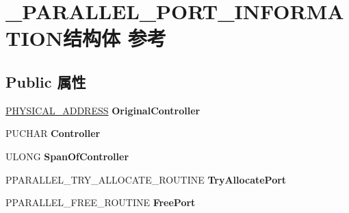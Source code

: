 \hypertarget{struct___p_a_r_a_l_l_e_l___p_o_r_t___i_n_f_o_r_m_a_t_i_o_n}{}\section{\+\_\+\+P\+A\+R\+A\+L\+L\+E\+L\+\_\+\+P\+O\+R\+T\+\_\+\+I\+N\+F\+O\+R\+M\+A\+T\+I\+O\+N结构体 参考}
\label{struct___p_a_r_a_l_l_e_l___p_o_r_t___i_n_f_o_r_m_a_t_i_o_n}
\subsection*{Public 属性}
\begin{DoxyCompactItemize}
\item 
\mbox{\label{struct___p_a_r_a_l_l_e_l___p_o_r_t___i_n_f_o_r_m_a_t_i_o_n_ad14cc1e5eae1beb81ab5bc08046a8927}} 
\hyperlink{union___l_a_r_g_e___i_n_t_e_g_e_r}{P\+H\+Y\+S\+I\+C\+A\+L\+\_\+\+A\+D\+D\+R\+E\+SS} {\bfseries Original\+Controller}
\item 
\mbox{\label{struct___p_a_r_a_l_l_e_l___p_o_r_t___i_n_f_o_r_m_a_t_i_o_n_a5a1355ab7256e672e46e64cd4e62c74e}} 
P\+U\+C\+H\+AR {\bfseries Controller}
\item 
\mbox{\label{struct___p_a_r_a_l_l_e_l___p_o_r_t___i_n_f_o_r_m_a_t_i_o_n_a6f216b012eaf7240f81d5950bbd25c30}} 
U\+L\+O\+NG {\bfseries Span\+Of\+Controller}
\item 
\mbox{\label{struct___p_a_r_a_l_l_e_l___p_o_r_t___i_n_f_o_r_m_a_t_i_o_n_a7a392790c25d6a32cf1999bcb4ad6974}} 
P\+P\+A\+R\+A\+L\+L\+E\+L\+\_\+\+T\+R\+Y\+\_\+\+A\+L\+L\+O\+C\+A\+T\+E\+\_\+\+R\+O\+U\+T\+I\+NE {\bfseries Try\+Allocate\+Port}
\item 
\mbox{\label{struct___p_a_r_a_l_l_e_l___p_o_r_t___i_n_f_o_r_m_a_t_i_o_n_a1d14d1be0c6387ad51d75a0c3ec23f1a}} 
P\+P\+A\+R\+A\+L\+L\+E\+L\+\_\+\+F\+R\+E\+E\+\_\+\+R\+O\+U\+T\+I\+NE {\bfseries Free\+Port}
\item 

\end{DoxyCompactItemize}
